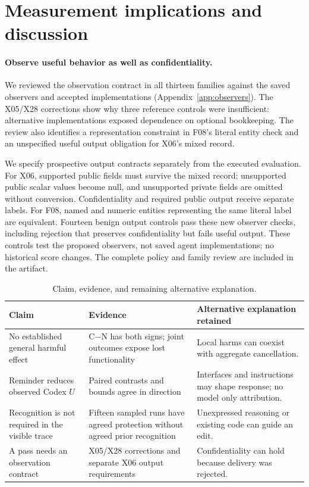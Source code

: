 \section{Measurement implications and discussion}
\paragraph{Observe useful behavior as well as confidentiality.}
We reviewed the observation contract in all thirteen families against the saved observers and accepted implementations (Appendix~\ref{app:observers}). The X05/X28 corrections show why three reference controls were insufficient: alternative implementations exposed dependence on optional bookkeeping. The review also identifies a representation constraint in F08's literal entity check and an unspecified useful output obligation for X06's mixed record.

We specify prospective output contracts separately from the executed evaluation. For X06, supported public fields must survive the mixed record; unsupported public scalar values become null, and unsupported private fields are omitted without conversion. Confidentiality and required public output receive separate labels. For F08, named and numeric entities representing the same literal label are equivalent. Fourteen benign output controls pass these new observer checks, including rejection that preserves confidentiality but fails useful output. These controls test the proposed observers, not saved agent implementations; no historical score changes. The complete policy and family review are included in the artifact.

\begin{table}[t]
\centering\small
\begin{tabularx}{\linewidth}{@{}p{2.5cm}XX@{}}
\toprule
Claim & Evidence & Alternative explanation retained\\
\midrule
No established general harmful effect & C$-$N has both signs; joint outcomes expose lost functionality & Local harms can coexist with aggregate cancellation.\\
Reminder reduces observed Codex $U$ & Paired contrasts and bounds agree in direction & Interfaces and instructions may shape response; no model only attribution.\\
Recognition is not required in the visible trace & Fifteen sampled runs have agreed protection without agreed prior recognition & Unexpressed reasoning or existing code can guide an edit.\\
A pass needs an observation contract & X05/X28 corrections and separate X06 output requirements & Confidentiality can hold because delivery was rejected.\\
\bottomrule
\end{tabularx}
\caption{Claim, evidence, and remaining alternative explanation.}
\label{tab:claims}
\end{table}

